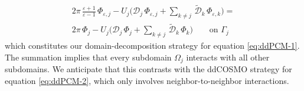 \begin{multline}\label{eq:1}
2\pi \, \frac{\varepsilon + 1}{\varepsilon - 1} \, \Phi_{\varepsilon,j} - U_j \bigg( {\mathcal{D}}_j \, \Phi_{\varepsilon,j} + \sum_{k \ne j} \, \tilde{\mathcal{D}}_{k} \, \Phi_{\varepsilon,k}  \bigg) = \\ 2 \pi \, {\Phi_j} - U_j \bigg( {\mathcal{D}}_j \,\Phi_{j} + \sum_{k \ne j} \, \tilde{\mathcal{D}}_{k} \, \Phi_{k}  \bigg) \qquad \text{on }\Gamma_j
\end{multline}
which constitutes our domain-decomposition strategy for equation \eqref{eq:ddPCM-1}. The summation implies that every subdomain $\Omega_j$ interacts with all other subdomains. We anticipate that this contrasts with the ddCOSMO strategy for equation \eqref{eq:ddPCM-2}, which only involves neighbor-to-neighbor interactions.

